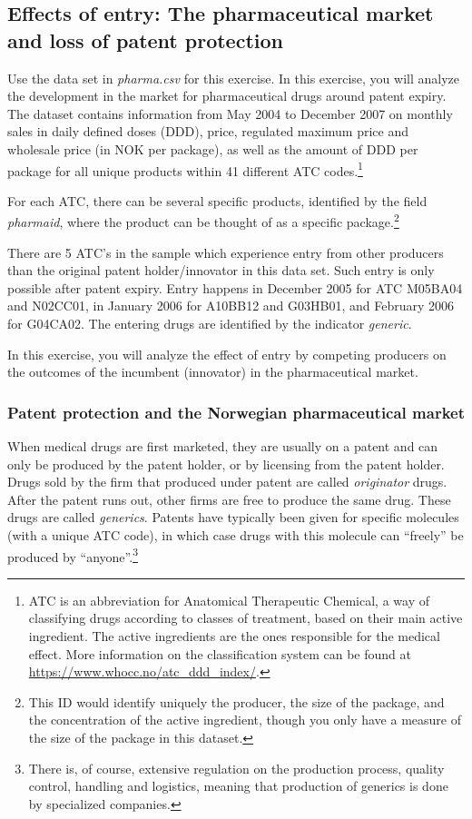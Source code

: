 \documentclass[12pt,a4paper]{article}
\begin{document}
\subsection*{Effects of entry: The pharmaceutical market and loss of patent protection}
Use the data set in \emph{pharma.csv} for this exercise. In this exercise, you will analyze the development in the market for pharmaceutical drugs around patent expiry. The dataset contains information from May 2004 to December 2007 on monthly sales in daily defined doses (DDD), price, regulated maximum price and wholesale price (in NOK per package), as well as the amount of DDD per package for all unique products within 41 different ATC codes.\footnote{ATC is an abbreviation for Anatomical Therapeutic Chemical, a way of classifying drugs according to classes of treatment, based on their main active ingredient. The active ingredients are the ones responsible for the medical effect. More information on the classification system can be found at \url{https://www.whocc.no/atc_ddd_index/}.}

For each ATC, there can be several specific products, identified by the field \emph{pharmaid}, where the product can be thought of as a specific package.\footnote{This ID would identify uniquely the producer, the size of the package, and the concentration of the active ingredient, though you only have a measure of the size of the package in this dataset.} 

There are 5 ATC's in the sample which experience entry from other producers than the original patent holder/innovator in this data set. Such entry is only possible after patent expiry. Entry happens in December 2005 for ATC M05BA04 and N02CC01, in January 2006 for A10BB12 and G03HB01, and February 2006 for G04CA02. The entering drugs are identified by the indicator \emph{generic}.

In this exercise, you will analyze the effect of entry by competing producers on the outcomes of the incumbent (innovator) in the pharmaceutical market.


\subsubsection*{Patent protection and the Norwegian pharmaceutical market}
When medical drugs are first marketed, they are usually on a patent and can only be produced by the patent holder, or by licensing from the patent holder. Drugs sold by the firm that produced under patent are called \emph{originator} drugs. After the patent runs out, other firms are free to produce the same drug. These drugs are called \emph{generics}. Patents have typically been given for specific molecules (with a unique ATC code), in which case drugs with this molecule can ``freely'' be produced by ``anyone''.\footnote{There is, of course, extensive regulation on the production process, quality control, handling and logistics, meaning that production of generics is done by specialized companies.}
\end{document}
